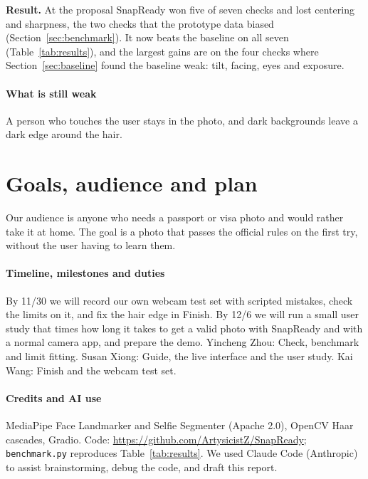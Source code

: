 \documentclass[11pt]{article}
\begin{document}
\textbf{Result.} At the proposal SnapReady won five of seven checks and lost centering and sharpness, the two checks that the prototype data biased (Section~\ref{sec:benchmark}). It now beats the baseline on all seven (Table~\ref{tab:results}), and the largest gains are on the four checks where Section~\ref{sec:baseline} found the baseline weak: tilt, facing, eyes and exposure.

\paragraph{What is still weak} A person who touches the user stays in the photo, and dark backgrounds leave a dark edge around the hair.

\section{Goals, audience and plan}

Our audience is anyone who needs a passport or visa photo and would rather take it at home. The goal is a photo that passes the official rules on the first try, without the user having to learn them.

\paragraph{Timeline, milestones and duties} By 11/30 we will record our own webcam test set with scripted mistakes, check the limits on it, and fix the hair edge in Finish. By 12/6 we will run a small user study that times how long it takes to get a valid photo with SnapReady and with a normal camera app, and prepare the demo.
Yincheng Zhou: Check, benchmark and limit fitting. Susan Xiong: Guide, the live interface and the user study. Kai Wang: Finish and the webcam test set.

\paragraph{Credits and AI use} MediaPipe Face Landmarker and Selfie Segmenter (Apache 2.0), OpenCV Haar cascades, Gradio. Code: \url{https://github.com/ArtysicistZ/SnapReady}; \texttt{benchmark.py} reproduces Table~\ref{tab:results}. We used Claude Code (Anthropic) to assist brainstorming, debug the code, and draft this report.
\end{document}
